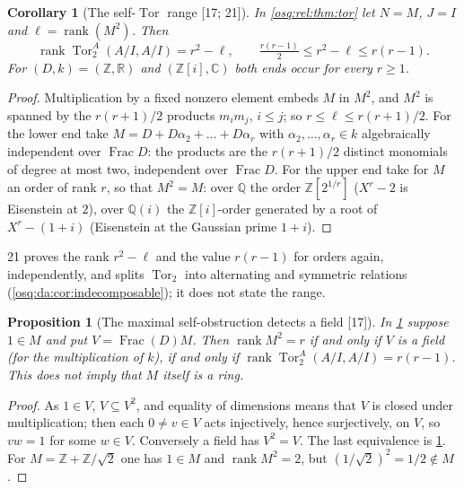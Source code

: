 \documentclass[11pt,letterpaper]{article}
\numberwithin{equation}{section}
\newtheorem{proposition}[proposition]{Proposition}
\newtheorem{corollary}[corollary]{Corollary}
\theoremstyle{definition}
\theoremstyle{remark}
\theoremstyle{plain}
\newcommand{\Z}{\mathbb Z}
\newcommand{\Q}{\mathbb Q}
\newcommand{\R}{\mathbb R}
\newcommand{\C}{\mathbb C}
\newcommand{\Frac}{\operatorname{Frac}}
\newcommand{\Tor}{\operatorname{Tor}}
\newcommand{\rk}{\operatorname{rank}}
\newcommand{\src}[1]{\textup{\textsf{[#1]}}}
\begin{document}
\begin{corollary}[The self-$\Tor$ range \src{17; 21}]\label{osq:rel:cor:selftor}
In \cref{osq:rel:thm:tor} let $N=M$, $J=I$ and $\ell=\rk(M^2)$. Then
\[
 \rk\Tor^A_2(A/I,A/I)=r^2-\ell,\qquad \tfrac{r(r-1)}2\le r^2-\ell\le r(r-1).
\]
For $(D,k)=(\Z,\R)$ and $(\Z[i],\C)$ both ends occur for every $r\ge1$.
\end{corollary}
\begin{proof}
Multiplication by a fixed nonzero element embeds $M$ in $M^2$, and $M^2$ is spanned by the $r(r+1)/2$ products $m_im_j$, $i\le j$; so
$r\le\ell\le r(r+1)/2$. For the lower end take $M=D+D\alpha_2+\dots+D\alpha_r$ with $\alpha_2,\dots,\alpha_r\in k$ algebraically
independent over $\Frac D$: the products are the $r(r+1)/2$ distinct monomials of degree at most two, independent over $\Frac D$. For
the upper end take for $M$ an order of rank $r$, so that $M^2=M$: over $\Q$ the order $\Z[2^{1/r}]$ ($X^r-2$ is Eisenstein at $2$),
over $\Q(i)$ the $\Z[i]$-order generated by a root of $X^r-(1+i)$ (Eisenstein at the Gaussian prime $1+i$).
\end{proof}

21 proves the rank $r^2-\ell$ and the value $r(r-1)$ for orders again, independently, and splits $\Tor_2$ into alternating and
symmetric relations (\cref{osq:da:cor:indecomposable}); it does not state the range.

\begin{proposition}[The maximal self-obstruction detects a field \src{17}]\label{osq:rel:prop:field}
In \cref{osq:rel:cor:selftor} suppose $1\in M$ and put $V=\Frac(D)M$. Then $\rk M^2=r$ if and only if $V$ is a field (for the
multiplication of $k$), if and only if $\rk\Tor^A_2(A/I,A/I)=r(r-1)$. This does not imply that $M$ itself is a ring.
\end{proposition}
\begin{proof}
As $1\in V$, $V\subseteq V^2$, and equality of dimensions means that $V$ is closed under multiplication; then each $0\ne v\in V$
acts injectively, hence surjectively, on $V$, so $vw=1$ for some $w\in V$. Conversely a field has $V^2=V$. The last equivalence is
\cref{osq:rel:cor:selftor}. For $M=\Z+\Z/\sqrt2$ one has $1\in M$ and $\rk M^2=2$, but $(1/\sqrt2)^2=1/2\notin M$.
\end{proof}
\end{document}
